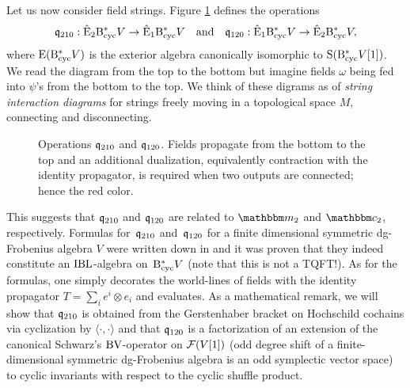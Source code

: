 \documentclass[\MainFolder/Text.tex]{subfiles}
\begin{document}
Let us now consider field strings. Figure \ref{Fig:OpCoOpDiag} defines the operations $$ \mathfrak{q}_{210}: \hat{\mathrm{E}}_2 \mathrm{B}_{\mathrm{cyc}}^* V \rightarrow \hat{\mathrm{E}}_1\mathrm{B}_{\mathrm{cyc}}^* V \quad\text{and}\quad \mathfrak{q}_{120}: \hat{\mathrm{E}}_1\mathrm{B}_{\mathrm{cyc}}^* V \rightarrow \hat{\mathrm{E}}_2\mathrm{B}_{\mathrm{cyc}}^* V, $$
where $\mathrm{E}(\mathrm{B}_{\mathrm{cyc}}^* V)$ is the exterior algebra canonically isomorphic to $\mathrm{S}(\mathrm{B}_{\mathrm{cyc}}^* V [1])$. We read the diagram from the top to the bottom but imagine fields $\omega$ being fed into $\psi$'s from the bottom to the top. We think of these digrams as of \emph{string interaction diagrams} for strings freely moving in a topological space $M$, connecting and disconnecting.
\begin{figure}[t]
\centering
 
 \caption[Operations $\OPQ_{210}$ and $\OPQ_{120}$.]{Operations $\OPQ_{210}$ and $\OPQ_{120}$. Fields propagate from the bottom to the top and an additional dualization, equivalently contraction with the identity propagator, is required when two outputs are connected; hence the red color.}
 \label{Fig:OpCoOpDiag}
\end{figure}
%
This suggests that $\OPQ_{210}$ and $\OPQ_{120}$ are related to $\StringOp_2$ and $\StringCoOp_2$, respectively. Formulas for~$\OPQ_{210}$ and~$\OPQ_{120}$ for a finite dimensional symmetric dg-Frobenius algebra $V$ were written down in \cite{Cieliebak2015} and it was proven that they indeed constitute an $\mathrm{IBL}$-algebra on~$\mathrm{B}_{\mathrm{cyc}}^* V$ (note that this is not a TQFT!). As for the formulas, one simply decorates the world-lines of fields with the identity propagator $T = \sum_i e^i \otimes e_i$ and evaluates. As a mathematical remark, we will show that $\OPQ_{210}$ is obtained from the Gerstenhaber bracket on Hochschild cochains via cyclization by $\langle\cdot,\cdot\rangle$ and that $\OPQ_{120}$  is a factorization of an extension of the canonical Schwarz's $\mathrm{BV}$-operator on $\mathcal{F}(V[1])$ (odd degree shift of a finite-dimensional symmetric dg-Frobenius algebra is an odd symplectic vector space) to cyclic invariants with respect to the cyclic shuffle product.
\end{document}
